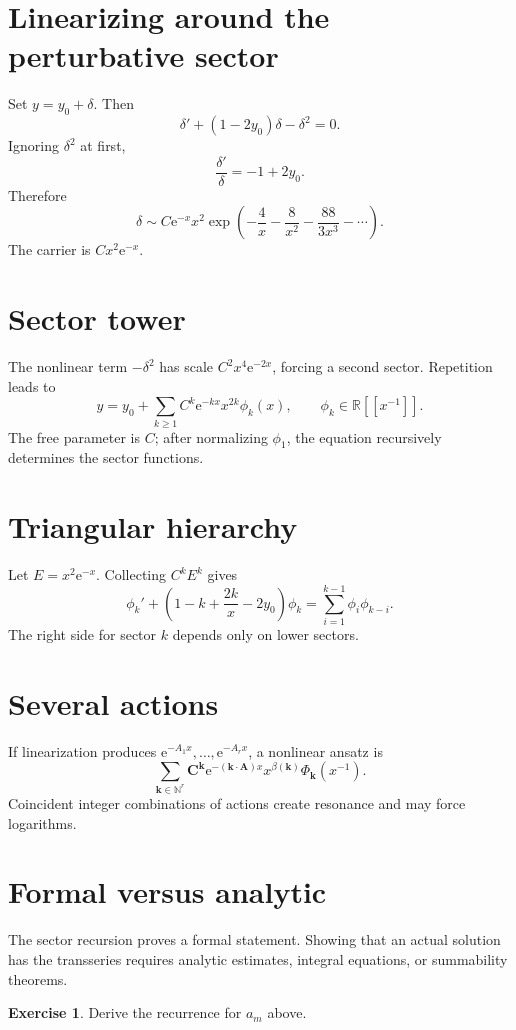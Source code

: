 \documentclass[11pt,oneside,openany]{book}
\newcommand{\R}{\mathbb{R}}
\newcommand{\N}{\mathbb{N}}
\newcommand{\e}{\mathrm{e}}
\theoremstyle{plain}
\theoremstyle{definition}
\newtheorem{exercise}{Exercise}[chapter]
\theoremstyle{remark}
\begin{document}
\section{Linearizing around the perturbative sector}
Set $y=y_0+\delta$. Then
\[
  \delta'+(1-2y_0)\delta-\delta^2=0.
\]
Ignoring $\delta^2$ at first,
\[
  \frac{\delta'}\delta=-1+2y_0.
\]
Therefore
\[
  \delta\sim C\e^{-x}x^2
  \exp\left(-\frac4x-\frac8{x^2}-\frac{88}{3x^3}-\cdots\right).
\]
The carrier is $C x^2\e^{-x}$.

\section{Sector tower}
The nonlinear term $-\delta^2$ has scale $C^2x^4\e^{-2x}$, forcing a second sector. Repetition leads to
\[
  \boxed{
  y=y_0+
  \sum_{k\ge1}C^k\e^{-kx}x^{2k}\phi_k(x),
  \qquad\phi_k\in\R[[x^{-1}]].}
\]
The free parameter is $C$; after normalizing $\phi_1$, the equation recursively determines the sector functions.

\section{Triangular hierarchy}
Let $E=x^2\e^{-x}$. Collecting $C^kE^k$ gives
\[
  \phi_k'+
  \left(1-k+\frac{2k}{x}-2y_0\right)\phi_k
  =\sum_{i=1}^{k-1}\phi_i\phi_{k-i}.
\]
The right side for sector $k$ depends only on lower sectors.

\section{Several actions}
If linearization produces $\e^{-A_1x},\ldots,\e^{-A_rx}$, a nonlinear ansatz is
\[
  \sum_{\bm k\in\N^r}
  \bm C^{\bm k}
  \e^{-(\bm k\cdot\bm A)x}
  x^{\beta(\bm k)}\Phi_{\bm k}(x^{-1}).
\]
Coincident integer combinations of actions create resonance and may force logarithms.

\section{Formal versus analytic}
The sector recursion proves a formal statement. Showing that an actual solution has the transseries requires analytic estimates, integral equations, or summability theorems.

\begin{exercise}
Derive the recurrence for $a_m$ above.
\end{exercise}
\end{document}
